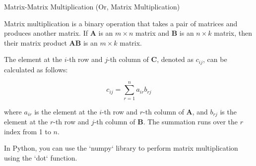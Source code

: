 \documentclass[aspectratio=169,xcolor=dvipsnames,svgnames,x11names,fleqn]{beamer}
\begin{document}
\begin{frame}{Matrix-Matrix Multiplication (Or, Matrix Multiplication)}

Matrix multiplication is a binary operation that takes a pair of  matrices and produces another matrix. If $\mathbf{A}$ is an $m \times n$ matrix and $\mathbf{B}$ is an $n \times k$ matrix, then their matrix product $\mathbf{AB}$ is an $m \times k$ matrix.

The element at the $i$-th row and $j$-th column of $\mathbf{C}$, denoted as $c_{ij}$, can be calculated as follows:

\begin{equation}
c_{ij} = \sum_{r=1}^{n} a_{ir}b_{rj}
\end{equation}

where $a_{ir}$ is the element at the $i$-th row and $r$-th column of $\mathbf{A}$, and $b_{rj}$ is the element at the $r$-th row and $j$-th column of $\mathbf{B}$. The summation runs over the $r$ index from 1 to $n$.


In Python, you can use the `numpy` library to perform matrix multiplication using the `dot` function.

\end{frame}

\end{document}
